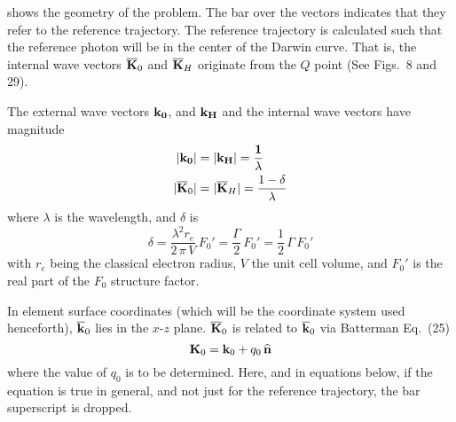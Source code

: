  shows the geometry of the problem. The bar over the vectors indicates
that they refer to the reference trajectory. The reference trajectory is calculated such that the
reference photon will be in the center of the Darwin curve. That is, the internal wave vectors
$\overline{{\bf K}}_0$ and $\overline{{\bf K}}_H$ originate from the $Q$ point (See \cite{b:batterman} Figs.~8 and 29).

The external wave vectors $\bf k_0$, and $\bf k_H$ and the internal wave vectors
have magnitude
\begin{align}
  |\bf k_0| &= |\bf k_H| = \frac{1}{\lambda} 
  \label{kk1l1} \\
  |\overline{{\bf K}}_0| &= |\overline{{\bf K}}_H| = \frac{1 - \delta}{\lambda}
  \label{kk1l2}
\end{align}
where $\lambda$ is the wavelength, and $\delta$ is
\begin{equation}
  \delta = \frac{\lambda^2 r_e}{2 \, \pi \, V} \, F_0' = \frac{\Gamma}{2} \, F_0'
  = \frac{1}{2} \, \Gamma \, F_0'
\end{equation}
with $r_e$ being the classical electron radius, $V$ the unit cell volume, and $F_0'$ is the real
part of the $F_0$ structure factor.

In element surface coordinates (which will be the coordinate system used henceforth), $\overline{{\bf k}}_0$
lies in the $x$-$z$ plane. $\overline{{\bf K}}_0$ is related to $\overline{{\bf k}}_0$ via Batterman Eq.~(25)
\begin{equation}
  {\bf K}_0 = {\bf k}_0 + q_0 \, {\widehat{\bf n}}
  \label{kkqn1}
\end{equation}
where the value of $q_0$ is to be determined. Here, and in equations below, if the equation is true
in general, and not just for the reference trajectory, the bar superscript is dropped.

